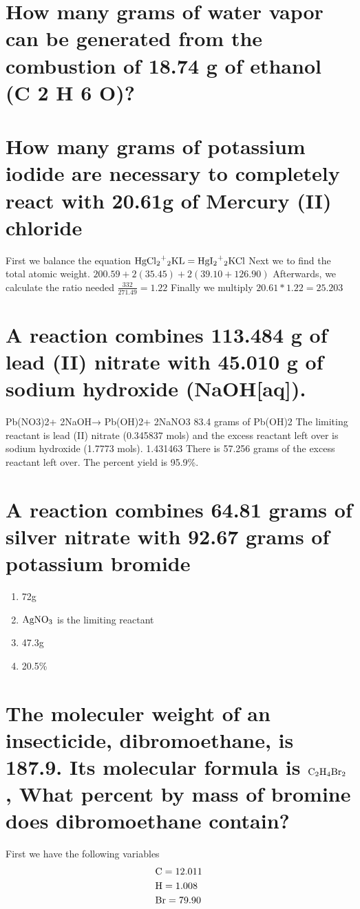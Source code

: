 \documentclass{scrartcl}
\begin{document}
\section{How many grams of water vapor can be generated from the combustion of 18.74 g of ethanol (C 2 H 6 O)?}
\label{sec:org6a06753}

\section{How many grams of potassium iodide are necessary to completely react with 20.61g of Mercury (II) chloride}
\label{sec:orgd152103}
First we balance the equation
\(\ce{HgCl2+2KL}=\ce{HgI2+2KCl}\)
Next we to find the total atomic weight.
\(200.59+2(35.45)+2(39.10+126.90)\)
Afterwards, we calculate the ratio needed
\(\frac{332}{271.49}=1.22\)
Finally we multiply
\(20.61*1.22=25.203\)

\section{A reaction combines 113.484 g of lead (II) nitrate with 45.010 g of sodium hydroxide (NaOH[aq]).}
\label{sec:org48ee9f8}
Pb(NO3)2+ 2NaOH→ Pb(OH)2+ 2NaNO3
83.4 grams of Pb(OH)2
The limiting reactant is lead (II) nitrate (0.345837 mols) and the excess reactant left over is sodium hydroxide (1.7773 mols).   1.431463
There is 57.256 grams of the excess reactant left over.
The percent yield is 95.9\%.


\section{A reaction combines 64.81 grams of silver nitrate with 92.67 grams of potassium bromide}
\label{sec:org8a6d206}
\begin{enumerate}
\item 72g
\item \(\ce{AgNO3}\) is the limiting reactant
\item 47.3g
\item 20.5\%
\end{enumerate}

\section{The moleculer weight of an insecticide, dibromoethane, is 187.9. Its molecular formula is \(\ce{C2H4Br2}\), What percent by mass of bromine does dibromoethane contain?}
\label{sec:orgae96d80}
First we have the following variables
\begin{align*}
&\ce{C} = 12.011\\
&\ce{H} = 1.008\\
&\ce{Br} = 79.90
\end{align*}
\end{document}

